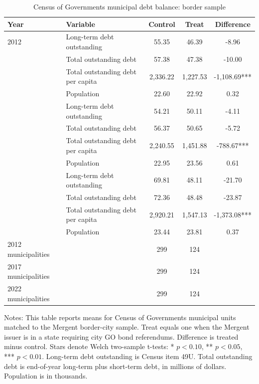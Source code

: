 \begin{table}[H]
\centering
\caption{Census of Governments municipal debt balance: border sample}
\begin{tabular*}{\textwidth}{@{\extracolsep{\fill}}llccc}
\toprule
Year & Variable & Control & Treat & Difference \\
\midrule
2012 & Long-term debt outstanding & 55.35 & 46.39 & -8.96 \\
 & Total outstanding debt & 57.38 & 47.38 & -10.00 \\
 & Total outstanding debt per capita & 2,336.22 & 1,227.53 & -1,108.69*** \\
 & Population & 22.60 & 22.92 & 0.32 \\
\addlinespace
2017 & Long-term debt outstanding & 54.21 & 50.11 & -4.11 \\
 & Total outstanding debt & 56.37 & 50.65 & -5.72 \\
 & Total outstanding debt per capita & 2,240.55 & 1,451.88 & -788.67*** \\
 & Population & 22.95 & 23.56 & 0.61 \\
\addlinespace
2022 & Long-term debt outstanding & 69.81 & 48.11 & -21.70 \\
 & Total outstanding debt & 72.36 & 48.48 & -23.87 \\
 & Total outstanding debt per capita & 2,920.21 & 1,547.13 & -1,373.08*** \\
 & Population & 23.44 & 23.81 & 0.37 \\
\midrule
2012 municipalities &  & 299 & 124 &  \\
2017 municipalities &  & 299 & 124 &  \\
2022 municipalities &  & 299 & 124 &  \\
\bottomrule
\end{tabular*}
\begin{minipage}{\textwidth}
\footnotesize Notes: This table reports means for Census of Governments municipal units matched to the Mergent border-city sample. Treat equals one when the Mergent issuer is in a state requiring city GO bond referendums. Difference is treated minus control. Stars denote Welch two-sample t-tests: * $p<0.10$, ** $p<0.05$, *** $p<0.01$. Long-term debt outstanding is Census item 49U. Total outstanding debt is end-of-year long-term plus short-term debt, in millions of dollars. Population is in thousands.
\end{minipage}
\end{table}
